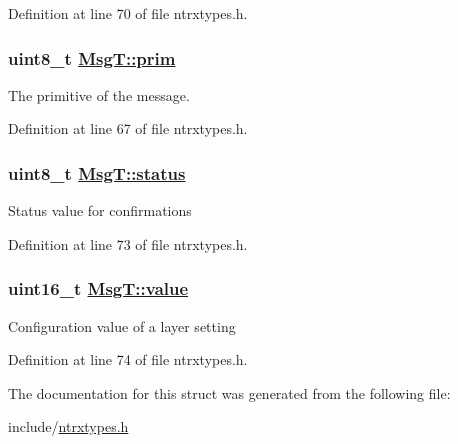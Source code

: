 Definition at line 70 of file ntrxtypes.h.\hypertarget{structMsgT_c5e6312583b2581386a17ee7ced2656f}{
\subsubsection[prim]{\setlength{\rightskip}{0pt plus 5cm}uint8\_\-t \hyperlink{structMsgT_c5e6312583b2581386a17ee7ced2656f}{Msg\-T::prim}}}
\label{structMsgT_c5e6312583b2581386a17ee7ced2656f}


The primitive of the message. 

Definition at line 67 of file ntrxtypes.h.\hypertarget{structMsgT_f1e6d2725308055637fbed518de493a8}{
\subsubsection[status]{\setlength{\rightskip}{0pt plus 5cm}uint8\_\-t \hyperlink{structMsgT_f1e6d2725308055637fbed518de493a8}{Msg\-T::status}}}
\label{structMsgT_f1e6d2725308055637fbed518de493a8}


Status value for confirmations 

Definition at line 73 of file ntrxtypes.h.\hypertarget{structMsgT_86aa9f2d1fc5ea4ebec6b7415e28c1a9}{
\subsubsection[value]{\setlength{\rightskip}{0pt plus 5cm}uint16\_\-t \hyperlink{structMsgT_86aa9f2d1fc5ea4ebec6b7415e28c1a9}{Msg\-T::value}}}
\label{structMsgT_86aa9f2d1fc5ea4ebec6b7415e28c1a9}


Configuration value of a layer setting 

Definition at line 74 of file ntrxtypes.h.

The documentation for this struct was generated from the following file:\begin{CompactItemize}
\item 
include/\hyperlink{ntrxtypes_8h}{ntrxtypes.h}\end{CompactItemize}
